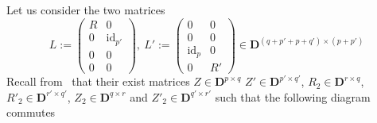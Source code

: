 \documentclass[10pt]{article}
\newcommand\g[1]{\textbf{#1}}
\newcommand\id[1]{\text{id}_{#1}}
\newcommand\D{\g{D}}
\begin{document}
Let us consider the two matrices
\[L:=\begin{pmatrix}
R & 0\\
0 & \id{p'}\\
0 & 0\\
0 & 0
\end{pmatrix},\ 
L':=\begin{pmatrix}
0 & 0\\
0 & 0\\
\id{p} & 0\\
0 & R'
\end{pmatrix}\in\D^{(q+p'+p+q')\times (p+p')}\]
Recall from~\cite{cluzeau2011constructive} that their exist matrices
$Z\in\D^{p\times q}$ $Z'\in\D^{p'\times q'}$, $R_2\in\D^{r\times q}$,
$R'_2\in\D^{r'\times q'}$, $Z_2\in\D^{q\times r}$ and $Z'_2\in\D^{q'
  \times r'}$
such that the following diagram commutes
\end{document}
